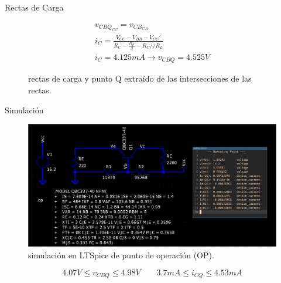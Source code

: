 \begin{frame}[allowframebreaks]{Rectas de Carga}
  \begin{figure}[!h]
    \centering
    \begin{minipage}{0.45\textwidth}
      \centering
    \end{minipage}
    \hfill
    \begin{minipage}{0.45\textwidth}
      \begin{gather*}
        v_{CBQ_{CC}} = v_{CB_{CA}}\\[6pt]
        i_C = \frac{V_{CC} - V_{BB} - V_{CC}'}{R_C - \frac{R_B}{\beta} - R_C // R_L}\\[6pt]
        i_C = 4.125mA \to v_{CBQ} = 4.525V
      \end{gather*}
    \end{minipage}
    \caption{rectas de carga y punto Q extraído de las intersecciones de las rectas.}
  \end{figure}

\end{frame}

\begin{frame}{Simulación}
  \begin{figure}[!ht]
    \centering
    \includegraphics[width=.9\textwidth]{images/sim_calculada.png}
    \caption{simulación en LTSpice de punto de operación (OP).}
  \end{figure}
  \begin{equation*}
    4.07V \leq v_{CBQ} \leq 4.98V \quad \quad 3.7mA \leq i_{CQ} \leq 4.53mA
  \end{equation*}
\end{frame}


